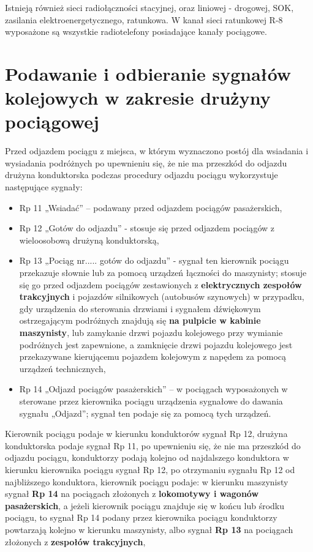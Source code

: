 Istnieją również sieci radiołączności stacyjnej, oraz liniowej - drogowej, SOK, zasilania elektroenergetycznego, ratunkowa. W kanał sieci ratunkowej R-8 wyposażone są wszystkie radiotelefony posiadające kanały pociągowe.



\chapter{Podawanie i odbieranie sygnałów kolejowych w zakresie drużyny pociągowej}

Przed odjazdem pociągu z miejsca, w którym wyznaczono postój dla wsiadania i wysiadania podróżnych po upewnieniu się, że nie ma przeszkód do
odjazdu drużyna konduktorska podczas procedury odjazdu pociągu wykorzystuje następujące sygnały:
\begin{itemize}
	\item Rp 11 „Wsiadać” – podawany przed odjazdem pociągów pasażerskich,
	\item Rp 12 „Gotów do odjazdu” - stosuje się przed odjazdem pociągów
	z wieloosobową drużyną konduktorską,
	\item  Rp 13 „Pociąg nr..... gotów do odjazdu” - sygnał ten kierownik pociągu przekazuje słownie lub za pomocą urządzeń łączności do maszynisty; stosuje 	się go przed odjazdem pociągów zestawionych z \textbf{elektrycznych zespołów trakcyjnych} i pojazdów silnikowych (autobusów szynowych) w przypadku, gdy urządzenia do sterowania drzwiami i sygnałem dźwiękowym ostrzegającym
	podróżnych znajdują się \textbf{na pulpicie w kabinie maszynisty}, lub zamykanie	drzwi pojazdu kolejowego przy wymianie podróżnych jest zapewnione,	a zamknięcie drzwi pojazdu kolejowego jest przekazywane kierującemu	pojazdem kolejowym z napędem za pomocą urządzeń technicznych,
	\item Rp 14 „Odjazd pociągów pasażerskich” – w pociągach wyposażonych w sterowane przez kierownika pociągu urządzenia sygnałowe do dawania
	sygnału „Odjazd”; sygnał ten podaje się za pomocą tych urządzeń.
\end{itemize}

Kierownik pociągu podaje w kierunku konduktorów sygnał Rp 12, drużyna konduktorska podaje sygnał Rp 11, po upewnieniu się, że nie ma przeszkód do odjazdu pociągu, konduktorzy podają kolejno od najdalszego konduktora w kierunku kierownika pociągu sygnał Rp 12, po otrzymaniu sygnału Rp 12 od najbliższego konduktora, kierownik pociągu podaje: w kierunku maszynisty sygnał \textbf{Rp 14} na pociągach złożonych z \textbf{lokomotywy i wagonów pasażerskich}, a jeżeli kierownik pociągu znajduje się w końcu lub środku pociągu, to sygnał Rp 14 podany przez kierownika pociągu konduktorzy powtarzają kolejno w kierunku maszynisty, albo sygnał \textbf{Rp 13} na pociągach złożonych z \textbf{zespołów trakcyjnych},

